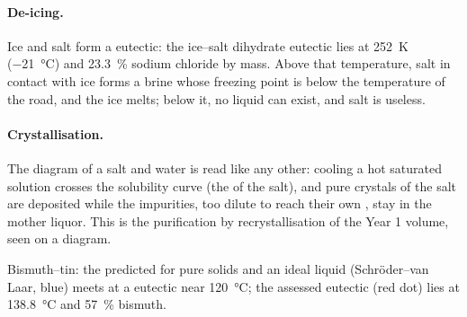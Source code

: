 \paragraph{De-icing.} Ice and salt form a eutectic: the ice--salt dihydrate
eutectic lies at \qty{252}{K} (\qty{-21}{\degreeCelsius}) and 23.3~\% sodium
chloride by mass. Above that temperature, salt in contact with ice forms a
brine whose freezing point is below the temperature of the road, and the ice
melts; below it, no liquid can exist, and salt is useless.

\paragraph{Crystallisation.} The diagram of a salt and water is read like any
other: cooling a hot saturated solution crosses the solubility curve (the
 of the salt), and pure crystals of the salt are deposited while the
impurities, too dilute to reach their own , stay in the mother liquor.
This is the purification by recrystallisation of the Year 1 volume, seen on a
diagram.

\begin{omfigure}

{\small Bismuth--tin: the  predicted for pure solids and an ideal
liquid (Schr\"oder--van Laar, blue) meets at a eutectic near
\qty{120}{\degreeCelsius}; the assessed eutectic (red dot) lies at
\qty{138.8}{\degreeCelsius} and 57~\% bismuth.}
\end{omfigure}

